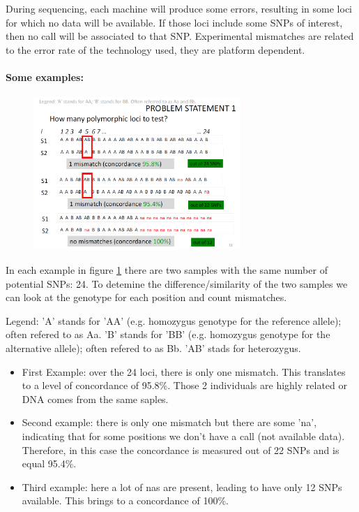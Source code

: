 During sequencing, each machine will produce some errors, resulting in some loci
for which no data will be available. If those loci include some SNPs of
interest, then no call will be associated to that SNP. Experimental mismatches
are related to the error rate of the technology used, they are platform
dependent. 

\paragraph{Some examples:}

\begin{figure}
	\centering
	\includegraphics[width=0.7\textwidth]{SNP_number.PNG}
	\caption{\label{fig:SNP_number}}
\end{figure}

In each example in figure \ref{fig:SNP_number} there are two samples with the
same number of potential SNPs: 24. To detemine the difference/similarity of the
two samples we can look at the genotype for each position and count mismatches.

Legend: 'A' stands for 'AA' (e.g. homozygus genotype for the reference allele);
often refered to as Aa. 'B' stands for 'BB' (e.g. homozygus genotype for the
alternative allele); often refered to as Bb. 'AB' stads for heterozygus.

\begin{itemize}
	\item First Example: over the 24 loci, there is only one mismatch. This
	translates to a level of concordance of 95.8\%. Those 2 individuals are
	highly related or DNA comes from the same saples.    
	\item Second example: there is only one mismatch but there are some 'na',
	indicating that for some positions we don't have a call (not available
	data). Therefore, in this case the concordance is measured out of 22 SNPs
	and is equal 95.4\%. 
	\item Third example: here a lot of nas are present, leading to have only 12
	SNPs available. This brings to a concordance of 100\%. 
\end{itemize}

